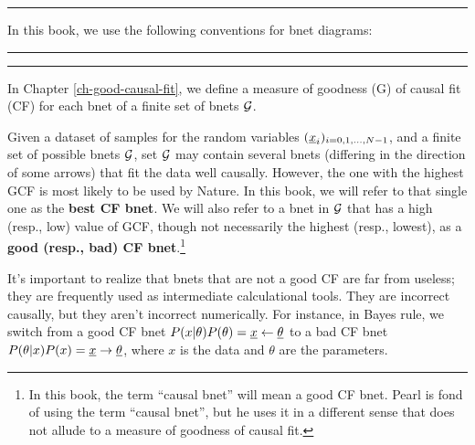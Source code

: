 \hrule
In this book,
we use the following conventions
for bnet diagrams:

\bnetInstantiations

\hrule
\hiddenNodes

\hrule
In  Chapter \ref{ch-good-causal-fit},
we define a measure
of goodness (G) of causal fit (CF)
for each bnet of a finite set of bnets ${\cal G}$.

Given a dataset of samples for
the random variables
$({\underline{x}}_i)_{i=0, 1, \ldots, N-1}$,
and a finite set of possible bnets ${\cal G}$,
set ${\cal G}$ may contain
several bnets (differing
in the direction
of some arrows) that
fit the data well causally. However,
the one with the highest
GCF is most likely to be used
by Nature.
In this book, we will refer to that
single one as the
{\bf best CF bnet}.
We will also refer to
a bnet in ${\cal G}$ that has a high (resp., low) value
of GCF, though not
necessarily the highest (resp., lowest),
as a {\bf good (resp., bad) CF bnet}.\footnote{
In  this book, the term \enquote{causal bnet}
will mean a good CF bnet. Pearl is fond
of using the term \enquote{causal bnet},
but he uses it in a different
sense that does not
allude to a measure of goodness of causal fit.}

It's important to realize
that bnets that are not a good CF
are far from useless; they
are frequently used
as intermediate calculational
tools. They are incorrect causally,
but they aren't incorrect numerically.
For instance, in Bayes rule,
we switch from a good CF bnet
$P(x|\theta)P(\theta)={\underline{x}}\leftarrow\underline{\theta}$
to a bad CF bnet
$P(\theta|x)P(x)={\underline{x}}\rightarrow\underline{\theta}$,
where $x$ is the data
and $\theta$ are the parameters.
